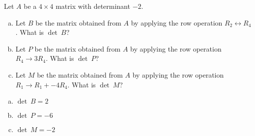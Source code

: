 
\begin{exerciseStatement}


Let \(A\) be a \(4 \times 4\) matrix with determinant \( -2 \).


\begin{enumerate}[(a)]
\item Let \(B\) be the matrix obtained from \(A\) by applying the row operation \( R_2 \leftrightarrow R_4 \). What is \(\operatorname{det}\ B\)?
\item Let \(P\) be the matrix obtained from \(A\) by applying the row operation \( R_4 \to 3R_4 \). What is \(\operatorname{det}\ P\)?
\item Let \(M\) be the matrix obtained from \(A\) by applying the row operation \( R_1 \to R_1 + -4R_4 \). What is \(\operatorname{det}\ M\)?
\end{enumerate}
    
\end{exerciseStatement}
    
\begin{exerciseAnswer} 

\begin{enumerate}[(a)]
\item \(\operatorname{det}\ B= 2 \)
\item \(\operatorname{det}\ P= -6 \)
\item \(\operatorname{det}\ M= -2 \)
\end{enumerate}
    
\end{exerciseAnswer}
    
